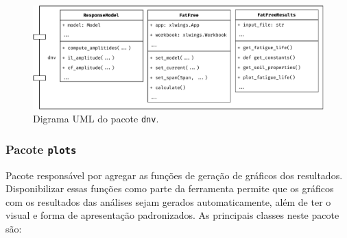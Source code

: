 \begin{figure}[!ht]
    \centering
    \caption{Digrama UML do pacote \texttt{dnv}.}\label{fig:dnv-uml}
    \includegraphics[width=\textwidth]{imagens/dnv-uml}
\end{figure}


\subsubsection{Pacote \texttt{plots}}


Pacote responsável por agregar as funções de geração de gráficos dos resultados. Disponibilizar essas funções como parte da ferramenta permite que os gráficos com os resultados das análises sejam gerados automaticamente, além de ter o visual e forma de apresentação padronizados. As principais classes neste pacote são:

